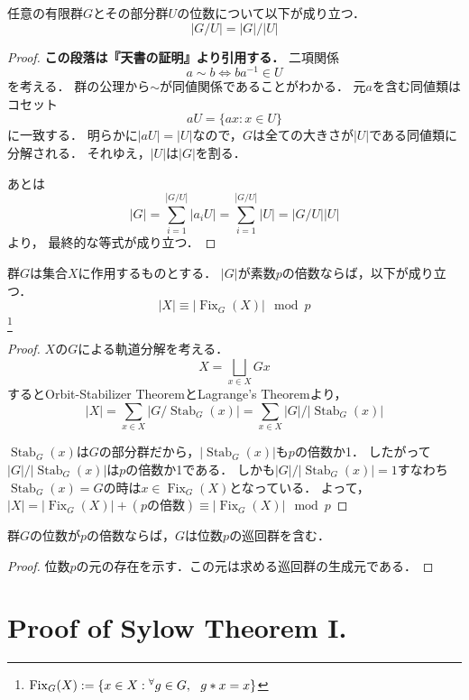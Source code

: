 \documentclass[a4paper]{jsarticle}
\newcommand{\Stab}{\operatorname{Stab}}
\newcommand{\Fix}{\operatorname{Fix}}
\begin{document}
    \begin{Thm}
        任意の有限群$G$とその部分群$U$の位数について以下が成り立つ．
        \[ |G/U|=|G|/|U| \]
    \end{Thm}
    \begin{proof}
        \textbf{この段落は『天書の証明』より引用する．}
        二項関係\[ a \sim b \iff ba^{-1} \in U \]を考える．
        群の公理から$\sim$が同値関係であることがわかる．
        元$a$を含む同値類はコセット\[ aU=\{ ax : x \in U \} \]に一致する．
        明らかに$|aU|=|U|$なので，$G$は全ての大きさが$|U|$である同値類に分解される．
        それゆえ，$|U|$は$|G|$を割る．

        あとは
        \[ |G|=\sum_{i=1}^{|G/U|}{|a_i U|}=\sum_{i=1}^{|G/U|}{|U|}=|G/U||U| \]より，
        最終的な等式が成り立つ．
        
    \end{proof}

    \begin{Lemma}
        群$G$は集合$X$に作用するものとする．
        $|G|$が素数$p$の倍数ならば，以下が成り立つ．
        \[ |X| \equiv |\Fix_G(X)| \mod p\]
        \footnote{$\Fix_G(X):=\{x \in X : \Forall{g \in G} g \ast x=x \}$}
    \end{Lemma}
    \begin{proof}
        $X$の$G$による軌道分解を考える．
        \[ X= \bigsqcup_{x \in X}{Gx} \]
        するとOrbit-Stabilizer TheoremとLagrange's Theoremより，
        \[ |X| = \sum_{x \in X}{|G/ \Stab_G(x)|} = \sum_{x \in X}{|G|/|\Stab_G(x)|}\]

        $\Stab_G(x)$は$G$の部分群だから，$|\Stab_G(x)|$も$p$の倍数か1．
        したがって$|G|/|\Stab_G(x)|$は$p$の倍数か1である．
        しかも$|G|/|\Stab_G(x)|=1$すなわち$\Stab_G(x)=G$の時は$x \in \Fix_G(X)$となっている．
        よって，$|X|=|\Fix_G(X)|+(p\mbox{の倍数}) \equiv |\Fix_G(X)| \mod p$
        
    \end{proof}

    \begin{Thm}
        群$G$の位数が$p$の倍数ならば，$G$は位数$p$の巡回群を含む．
    \end{Thm}
    \begin{proof}
        位数$p$の元の存在を示す．この元は求める巡回群の生成元である．
    \end{proof}

\section{Proof of Sylow Theorem I.}
\end{document}
